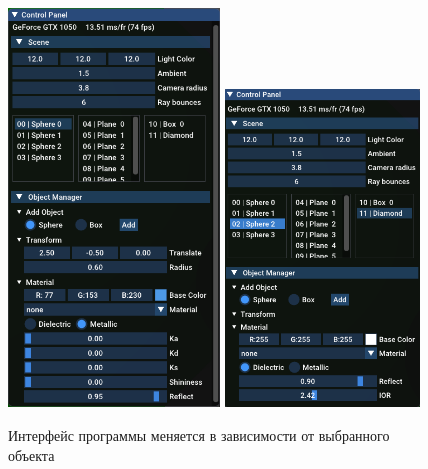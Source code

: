 \begin{figure}[h]
    \centering
    \includegraphics[width=0.5\textwidth]{img/screenshot/ui1.png}
    \includegraphics[width=0.46\textwidth]{img/screenshot/ui2.png}
    \caption{Интерфейс программы меняется в зависимости от выбранного объекта}
    \label{fig:3.1}
\end{figure}

